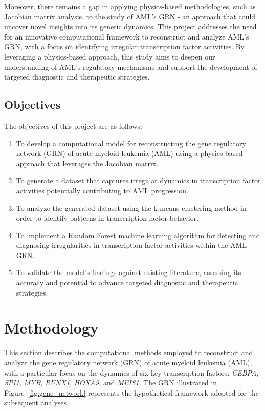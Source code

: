 \documentclass[a4paper,12pt]{article}
\begin{document}
Moreover, there remains a gap in applying physics-based methodologies, such as Jacobian matrix analysis, to the study of AML’s GRN - an approach that could uncover novel insights into its genetic dynamics. This project addresses the need for an innovative computational framework to reconstruct and analyze AML’s GRN, with a focus on identifying irregular transcription factor activities. By leveraging a physics-based approach, this study aims to deepen our understanding of AML’s regulatory mechanisms and support the development of targeted diagnostic and therapeutic strategies.

\subsection{Objectives}
The objectives of this project are as follows:
\begin{enumerate}
	\item To develop a computational model for reconstructing the gene regulatory network (GRN) of acute myeloid leukemia (AML) using a physics-based approach that leverages the Jacobian matrix.
	\item To generate a dataset that captures irregular dynamics in transcription factor activities potentially contributing to AML progression.
	\item To analyze the generated dataset using the k-means clustering method in order to identify patterns in transcription factor behavior.
	\item To implement a Random Forest machine learning algorithm for detecting and diagnosing irregularities in transcription factor activities within the AML GRN.
	\item To validate the model’s findings against existing literature, assessing its accuracy and potential to advance targeted diagnostic and therapeutic strategies.
\end{enumerate}



\section{Methodology}
This section describes the computational methods employed to reconstruct and analyze the gene regulatory network (GRN) of acute myeloid leukemia (AML), with a particular focus on the dynamics of six key transcription factors: \textit{CEBPA}, \textit{SPI1}, \textit{MYB}, \textit{RUNX1}, \textit{HOXA9}, and \textit{MEIS1}. The GRN illustrated in Figure~\ref{fig:gene_network} represents the hypothetical framework adopted for the subsequent analyses \cite{Maura2021,Estey2012,Storrie2016,Grimwade1995,Papaemmanuil2016,Ley2013}.
\end{document}
